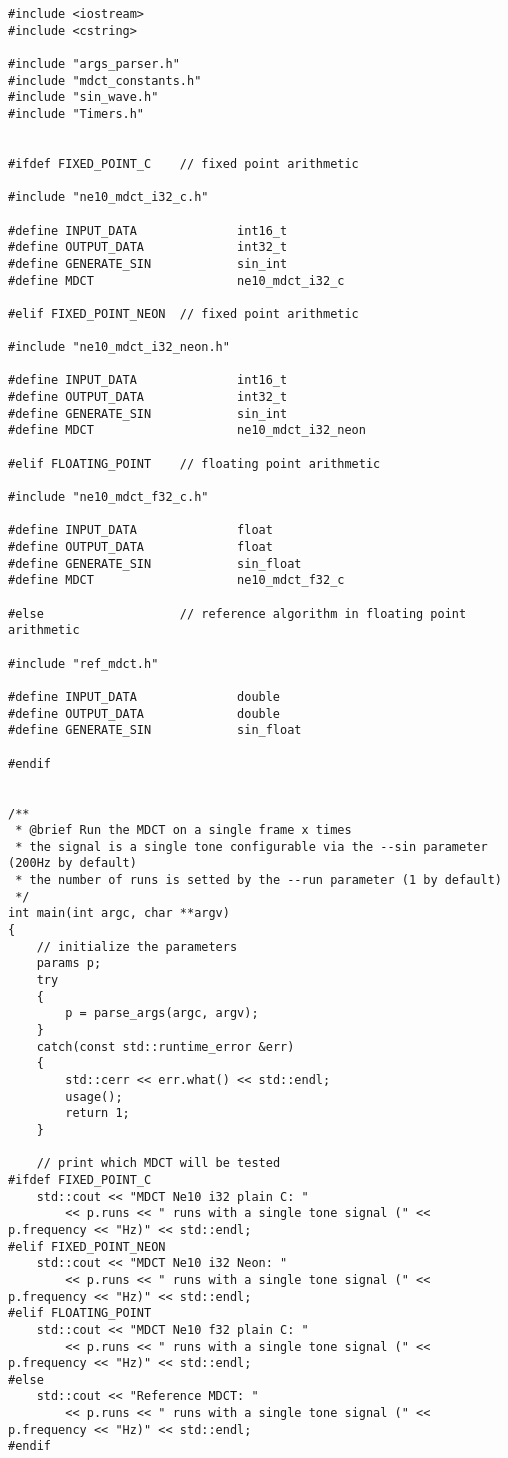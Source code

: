 \documentclass{article}
\begin{document}
\begin{lstlisting}
#include <iostream>
#include <cstring>

#include "args_parser.h"
#include "mdct_constants.h"
#include "sin_wave.h"
#include "Timers.h"


#ifdef FIXED_POINT_C    // fixed point arithmetic

#include "ne10_mdct_i32_c.h"

#define INPUT_DATA              int16_t
#define OUTPUT_DATA             int32_t
#define GENERATE_SIN            sin_int
#define MDCT                    ne10_mdct_i32_c

#elif FIXED_POINT_NEON  // fixed point arithmetic

#include "ne10_mdct_i32_neon.h"

#define INPUT_DATA              int16_t
#define OUTPUT_DATA             int32_t
#define GENERATE_SIN            sin_int
#define MDCT                    ne10_mdct_i32_neon

#elif FLOATING_POINT    // floating point arithmetic

#include "ne10_mdct_f32_c.h"

#define INPUT_DATA              float
#define OUTPUT_DATA             float
#define GENERATE_SIN            sin_float
#define MDCT                    ne10_mdct_f32_c

#else                   // reference algorithm in floating point arithmetic

#include "ref_mdct.h"

#define INPUT_DATA              double
#define OUTPUT_DATA             double
#define GENERATE_SIN            sin_float

#endif


/**
 * @brief Run the MDCT on a single frame x times
 * the signal is a single tone configurable via the --sin parameter (200Hz by default)
 * the number of runs is setted by the --run parameter (1 by default)
 */
int main(int argc, char **argv)
{
    // initialize the parameters
    params p;
    try
    {
        p = parse_args(argc, argv);
    }
    catch(const std::runtime_error &err)
    {
        std::cerr << err.what() << std::endl;
        usage();
        return 1;
    }

    // print which MDCT will be tested
#ifdef FIXED_POINT_C
    std::cout << "MDCT Ne10 i32 plain C: "
        << p.runs << " runs with a single tone signal (" << p.frequency << "Hz)" << std::endl;
#elif FIXED_POINT_NEON
    std::cout << "MDCT Ne10 i32 Neon: "
        << p.runs << " runs with a single tone signal (" << p.frequency << "Hz)" << std::endl;
#elif FLOATING_POINT
    std::cout << "MDCT Ne10 f32 plain C: "
        << p.runs << " runs with a single tone signal (" << p.frequency << "Hz)" << std::endl;
#else
    std::cout << "Reference MDCT: "
        << p.runs << " runs with a single tone signal (" << p.frequency << "Hz)" << std::endl;
#endif


\end{lstlisting}
\end{document}
